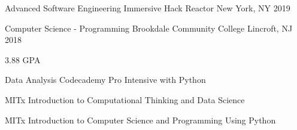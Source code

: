 
\begin{cventries}
  \cventry
    {Advanced Software Engineering Immersive}
    {Hack Reactor}
    {New York, NY}
    {2019}
    {}
    
  \cventry
    {Computer Science - Programming} %
    {Brookdale Community College} %
    {Lincroft, NJ} %
    {2018} %
        {
      \begin{cvitems} %
         \item {3.88 GPA}
      \end{cvitems}
    }
    {}

  {
    \begin{cvitems}
        \item{Data Analysis Codecademy Pro Intensive with Python}
        \item{MITx Introduction to Computational Thinking and Data Science}
        \item{MITx Introduction to Computer Science and Programming Using Python}
    \end{cvitems}
  }
\end{cventries}
